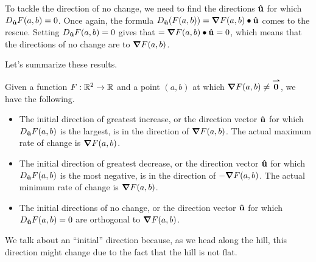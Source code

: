 \documentclass{ximera}
\begin{document}
To tackle the direction of no change, we need to find the directions
$\mathbf{\hat{u}}$ for which $D_{\mathbf{\hat{u}}} F(a,b) =0$. Once again, the formula
$D_{\mathbf{\hat{u}}}(F(a,b)) = \boldsymbol\nabla{F}(a,b) \bullet \mathbf{\hat{u}}$ comes to the
rescue. Setting $D_{\mathbf{\hat{u}}} F(a,b) =0$ gives that $= \boldsymbol\nabla{F}(a,b)
\bullet \mathbf{\hat{u}} = 0$, which means that the directions of no change are
 to
$\boldsymbol\nabla{F}(a,b)$.

Let's summarize these results.

\begin{theorem}
Given a function $F:\mathbb R^2 \to \mathbb R$ and a point $(a,b)$ at which $\boldsymbol\nabla{F}(a,b) \neq {\overset{\boldsymbol{\rightharpoonup}}{\mathbf{0}}}$, we have the following.

\begin{itemize}
\item The initial direction of greatest increase, or the direction vector $\mathbf{\hat{u}}$ for which $D_{\mathbf{\hat{u}}} F(a,b)$ is the largest, is in the direction of $\boldsymbol\nabla{F}(a,b)$. The actual maximum rate of change is $\boldsymbol\nabla{F}(a,b)$.
\item The initial direction of greatest decrease, or the direction
  vector $\mathbf{\hat{u}}$ for which $D_{\mathbf{\hat{u}}} F(a,b)$ is the most
  negative, is in the direction of $-\boldsymbol\nabla{F}(a,b)$. The actual
  minimum rate of change is $\boldsymbol\nabla{F}(a,b)$.
\item The initial directions of no change, or the direction vector $\mathbf{\hat{u}}$ for which $D_{\mathbf{\hat{u}}} F(a,b)=0$ are orthogonal to $\boldsymbol\nabla{F}(a,b)$.
\end{itemize}
\end{theorem}

\begin{remark}
We talk about an ``initial'' direction because, as we head along the
hill, this direction might change due to the fact that the hill is not
flat.
\end{remark}
\end{document}
